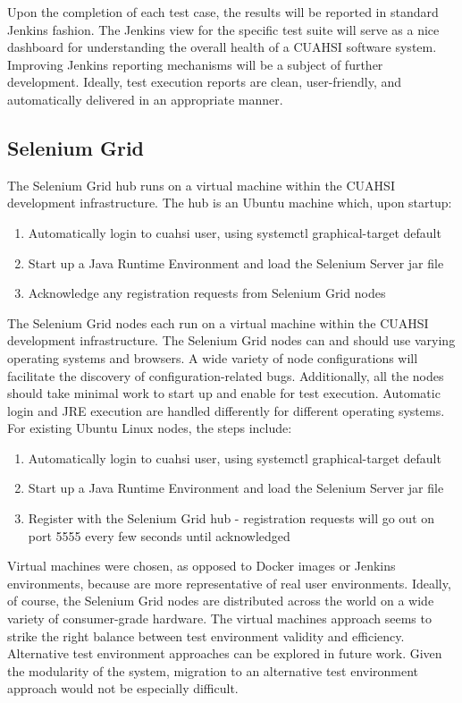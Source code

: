 \documentclass[10pt]{article}
\begin{document}
Upon the completion of each test case, the results will be reported in standard Jenkins fashion.  The Jenkins view for the specific test suite will serve as a nice dashboard for understanding the overall health of a CUAHSI software system.  Improving Jenkins reporting mechanisms will be a subject of further development.  Ideally, test execution reports are clean, user-friendly, and automatically delivered in an appropriate manner.

\subsection{Selenium Grid}
The Selenium Grid hub runs on a virtual machine within the CUAHSI development infrastructure.  The hub is an Ubuntu machine which, upon startup:
\begin{enumerate}
  \item Automatically login to cuahsi user, using systemctl graphical-target default
  \item Start up a Java Runtime Environment and load the Selenium Server jar file
  \item Acknowledge any registration requests from Selenium Grid nodes
\end{enumerate}
The Selenium Grid nodes each run on a virtual machine within the CUAHSI development infrastructure.  The Selenium Grid nodes can and should use varying operating systems and browsers.  A wide variety of node configurations will facilitate the discovery of configuration-related bugs.  Additionally, all the nodes should take minimal work to start up and enable for test execution.  Automatic login and JRE execution are handled differently for different operating systems.  For existing Ubuntu Linux nodes, the steps include: 
\begin{enumerate}
  \item Automatically login to cuahsi user, using systemctl graphical-target default
  \item Start up a Java Runtime Environment and load the Selenium Server jar file
  \item Register with the Selenium Grid hub - registration requests will go out on port 5555 every few seconds until acknowledged
\end{enumerate}

Virtual machines were chosen, as opposed to Docker images or Jenkins environments, because are more representative of real user environments.  Ideally, of course, the Selenium Grid nodes are distributed across the world on a wide variety of consumer-grade hardware.  The virtual machines approach seems to strike the right balance between test environment validity and efficiency.  Alternative test environment approaches can be explored in future work.  Given the modularity of the system, migration to an alternative test environment approach would not be especially difficult.
\end{document}
